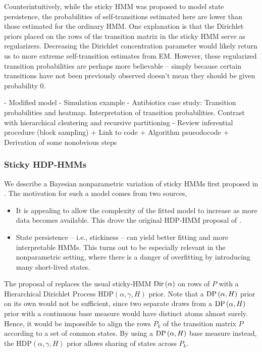 \documentclass[14pt]{extreport}
\begin{document}
Counterintuitively, while the sticky HMM was proposed to model state
persistence, the probabilities of self-transitions estimated here are lower than
those estimated for the ordinary HMM. One explanation is that the Dirichlet
priors placed on the rows of the transition matrix in the sticky HMM serve as
regularizers. Decreasing the Dirichlet concentration parameter would likely
return us to more extreme self-transition estimates from EM. However, these
regularized transition probabilities are perhaps more believable -- simply
because certain transitions have not been previously observed doesn't mean they
should be given probability 0.

- Modified model
- Simulation example
- Antibiotics case study: Transition probabilities and heatmap. Interpretation
of transition probabilities. Contrast with hierarchical clsutering and recursive
partitioning
- Review inferential procedure (block sampling)
  + Link to code
  + Algorithm psueodocode
  + Derivation of some nonobvious steps

\subsubsection{Sticky HDP-HMMs}
\label{sec:sticky_hdp_hmm}

We describe a Bayesian nonparametric variation of sticky HMMs first proposed in
\citep{fox2008hdp}. The motivation for such a model comes from two sources,

\begin{itemize}
\item It is appealing to allow the complexity of the fitted model to increase as
  more data becomes available. This drove the original HDP-HMM proposal of
  \citep{teh2006hierarchical}.
\item State persistence -- i.e., stickiness -- can yield better fitting and more
  interpretable HMMs. This turns out to be especially relevant in the
  nonparametric setting, where there is a danger of overfitting by introducing
  many short-lived states.
\end{itemize}

The proposal of \citep{teh2006hierarchical} replaces the usual sticky-HMM
$\textnormal{Dir}\left(\alpha\right)$ on rows of $P$ with a Hierarchical Dirichlet Process
$\text{HDP}\left(\alpha, \gamma, H\right)$ prior. Note that a $\textnormal{DP}\left(\alpha,
H\right)$ prior on its own would not be sufficient, since two separate draws
from a $\textnormal{DP}\left(\alpha, H\right)$ prior with a continuous base measure would
have distinct atoms almost surely. Hence, it would be impossible to align the
rows $P_{k}$ of the transition matrix $P$ according to a set of common states.
By using a $\textnormal{DP}\left(\alpha, H\right)$ base measure instead, the
$\text{HDP}\left(\alpha, \gamma, H\right)$ prior allows sharing of states across
$P_{k}$.
\end{document}
